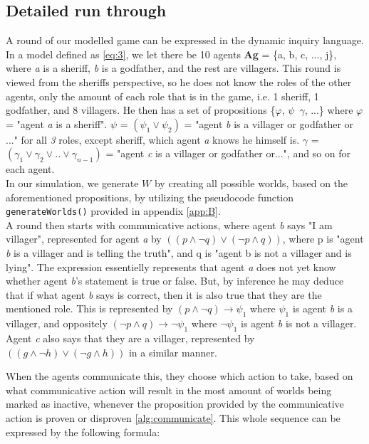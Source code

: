 \subsection{Detailed run through}\label{sec:ARoundOfTheGame}
A round of our modelled game can be expressed in the dynamic inquiry language.
In a model defined as \cref{eq:3}, we let there be 10 agents \textbf{Ag} = \{a,
b, c, ..., j\}, where \textit{a} is a sheriff, \textit{b} is a godfather, and
the rest are villagers. This round is viewed from the sheriffs perspective, so
he does not know the roles of the other agents, only the amount of each role
that is in the game, i.e. 1 sheriff, 1 godfather, and 8 villagers. He then has
a set of propositions \{$\varphi$, $\psi$\, $\gamma$, ...\} where $\varphi$ =
"agent \textit{a} is a sheriff". $\psi$ = $(\psi_1 \lor \psi_2)$ = "agent
\textit{b} is a villager or godfather or ..." for all \textit{3} roles, except
sheriff, which agent \textit{a} knows he himself is. $\gamma$ = $(\gamma_1 \lor
	\gamma_2 \lor .. \lor \gamma_{n-1}) $ = "agent \textit{c} is a villager or
godfather or...", and so on for each agent. \\ In our simulation, we generate
$W$ by creating all possible worlds, based on the aforementioned propositions,
by utilizing the pseudocode function
\lstinline{generateWorlds()} provided in appendix \ref{app:B}. \\ A round then
starts with communicative actions, where agent \textit{b} says "I am villager",
represented for agent \textit{a} by $((p \land \neg q) \lor (\neg p \land q))$, where p is "agent \textit{b} is a villager and is telling the truth",
and q is "agent b is not a villager and is lying". The expression essentielly represents that agent \textit{a} does not yet know whether
agent \textit{b}'s statement is true or false. But, by inference he may deduce
that if what agent \textit{b} says is correct, then it is also true that they
are the mentioned role. This is represented by $(p \land \neg q) \rightarrow
	\psi_1$ where $\psi_1$ is agent \textit{b} is a villager, and oppositely $(\neg
	p \land q) \rightarrow \neg \psi_1$ where $\neg \psi_1$ is agent \textit{b} is
not a villager. \\ Agent \textit{c} also says that they are a villager,
represented by $((g \land \neg h) \lor (\neg g \land h))$ in a similar manner.

When the agents communicate this, they choose which action to take, based on
what communicative action will result in the most amount of worlds being marked
as inactive, whenever the proposition provided by the communicative action is
proven or disproven \ref{alg:communicate}. This whole sequence can be expressed
by the following formula:

